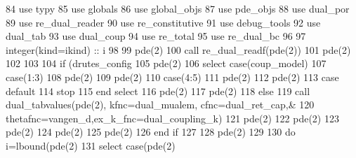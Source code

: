 \begin{DoxyCode}
84       \textcolor{keywordtype}{use }typy
85       \textcolor{keywordtype}{use }globals
86       \textcolor{keywordtype}{use }global_objs
87       \textcolor{keywordtype}{use }pde_objs
88       \textcolor{keywordtype}{use }dual_por
89       \textcolor{keywordtype}{use }re_dual_reader
90       \textcolor{keywordtype}{use }re_constitutive
91       \textcolor{keywordtype}{use }debug_tools
92       \textcolor{keywordtype}{use }dual_tab
93       \textcolor{keywordtype}{use }dual_coup
94       \textcolor{keywordtype}{use }re_total
95       \textcolor{keywordtype}{use }re_dual_bc
96 
97       \textcolor{keywordtype}{integer(kind=ikind)} :: i
98       
99       pde(2)%
100       \textcolor{keyword}{call }re_dual_readf(pde(2))
101       pde(2)%
102 
103       
104      \textcolor{keywordflow}{if} (drutes_config%
105             pde(2)%
106             \textcolor{keywordflow}{select case}(coup_model)
107              \textcolor{keywordflow}{case}(1:3)
108                pde(2)%
109                pde(2)%
110              \textcolor{keywordflow}{case}(4:5)
111                pde(2)%
112                pde(2)%
113 \textcolor{keywordflow}{             case default}
114              stop
115 \textcolor{keywordflow}{            end select}
116             pde(2)%
117             pde(2)%
118       \textcolor{keywordflow}{else}
119             \textcolor{keyword}{call }dual_tabvalues(pde(2), kfnc=dual_mualem, cfnc=dual_ret_cap\textcolor{comment}{,&}
120 \textcolor{comment}{            thetafnc=vangen_d,ex\_k\_fnc=dual_coupling_k)}
121 \textcolor{comment}{            pde(2)%
122 \textcolor{comment}{            pde(2)%
123 \textcolor{comment}{            pde(2)%
124 \textcolor{comment}{            pde(2)%
125 \textcolor{comment}{            pde(2)%
126 \textcolor{comment}{}\textcolor{keywordflow}{      end if}
127       
128       pde(2)%
129       
130       \textcolor{keywordflow}{do} i=lbound(pde(2)%
131         \textcolor{keywordflow}{select case}(pde(2)%
}}}}}
\end{DoxyCode}
